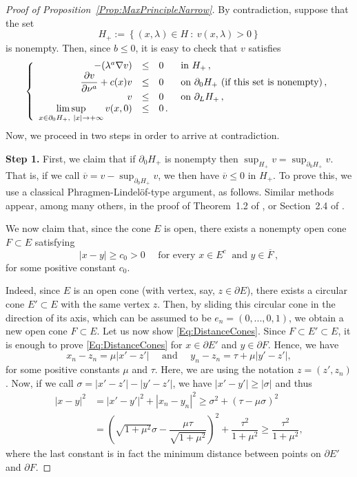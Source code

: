 \documentclass[12pt,reqno]{amsart}
\theoremstyle{definition}
\theoremstyle{remark}
\newcommand\beqc[1]{\left\{\begin{array}{#1}}
\newcommand\eeqc{\end{array} \right.}
\def\PDEsystem{rcll}
\let\div\relax
\DeclareMathOperator{\div}{div}
\def\ds{\displaystyle}
\numberwithin{equation}{section}
\begin{document}
\begin{proof}[Proof of Proposition~\ref{Prop:MaxPrincipleNarrow}] 
By contradiction, suppose that the set 
$$
H_+ := \left\{(x,\lambda) \in H \ : \ v(x,\lambda)>0 \right\}
$$ 
is nonempty. Then, since $b\leq 0$, it is easy to check that $v$ satisfies
$$
\beqc{\PDEsystem}
-\div(\lambda^a \nabla v) &\leq& 0 & \text{ in } H_+\,, \\
\dfrac{\partial v}{\partial \nu^a}  + c(x) v &\leq & 0 & \text{ on } \partial_0 H_+ \text{ (if this set is nonempty)}\,, \\
v & \leq & 0 & \text{ on } \partial_L H_+\,,\\
\ds \limsup_{x \in \partial_0H_+,\ |x|\to +\infty} v(x,0) & \leq & 0\,.
\eeqc
$$
Now, we proceed in two steps in order to arrive at contradiction.

\textbf{Step 1.}
First, we claim that if $\partial_0 H_+$ is nonempty then $\sup_{H_+} v = \sup_{\partial_0 H_+} v $. That is, if we call $\overline{v} = v - \sup_{\partial_0 H_+} v$, we then have $\overline{v} \leq 0$ in $H_+$. To prove this, we use a classical Phragmen-Lindelöf-type argument, as follows. Similar methods appear, among many others, in the proof of Theorem~1.2 of \cite{BerestyckiCaffarelliNiremberg-Monotonicity}, or Section~2.4 of \cite{CabreSolaMorales}.

We now claim that, since the cone $E$ is open, there exists a nonempty open cone $F \subset E$ satisfying
\begin{equation}
\label{Eq:DistanceCones}
|x-y| \geq c_0 > 0 \quad \text{ for every } x\in E^c \ \text{ and } y \in \overline{F}\,,
\end{equation}
for some positive constant $c_0$.

Indeed, since $E$ is an open cone (with vertex, say, $z\in \partial E$), there exists a circular cone $E'\subset E$ with the same vertex $z$. Then, by sliding this circular cone in the direction of its axis, which can be assumed to be $e_n = (0,...,0,1)$, we obtain a new open cone $F\subset E$. Let us now show \eqref{Eq:DistanceCones}. Since $F \subset E' \subset E$, it is enough to prove \eqref{Eq:DistanceCones} for $x\in \partial E'$ and $ y\in\partial F$. Hence, we have
$$x_n-z_n = \mu |x'-z'| \quad \text{ and } \quad y_n-z_n = \tau + \mu |y'-z'|, $$
for some positive constants $\mu$ and $\tau$. Here, we are using the notation $z = (z',z_n)$. Now, if we call $\sigma = |x'-z'|-|y'-z'|$, we have $|x'-y'|\geq |\sigma|$ and thus
\begin{align*}
|x-y|^2 &= |x'-y'|^2 + |x_n-y_n|^2 \geq \sigma^2 + (\tau- \mu \sigma)^2   \\
&= \left ( \sqrt{1+\mu^2} \sigma - \dfrac{\mu\tau}{\sqrt{1+\mu^2}}\right )^2 + \dfrac{\tau^2}{1+\mu^2}\geq\dfrac{\tau^2}{1+\mu^2},
\end{align*}
where the last constant is in fact the minimum distance between points on $\partial E'$ and $\partial F$. 


\end{proof}
\end{document}
